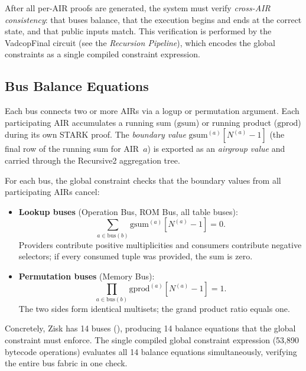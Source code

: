 After all per-AIR proofs are generated, the system must verify
\emph{cross-AIR consistency}: that buses balance, that the execution
begins and ends at the correct state, and that public inputs match.
This verification is performed by the VadcopFinal circuit
(see the \emph{Recursion Pipeline}), which encodes the
global constraints as a single compiled constraint expression.

\subsection{Bus Balance Equations}
\label{sec:bus-balance}

Each bus connects two or more AIRs via a logup or permutation argument.
Each participating AIR accumulates a running sum ($\mathrm{gsum}$) or
running product ($\mathrm{gprod}$) during its own STARK proof.
The \emph{boundary value} $\mathrm{gsum}^{(a)}[N^{(a)}-1]$
(the final row of the running sum for AIR~$a$) is exported as an
\emph{airgroup value} and carried through the Recursive2 aggregation tree.

For each bus, the global constraint checks that the boundary values
from all participating AIRs cancel:

\begin{itemize}[nosep]
  \item \textbf{Lookup buses} (Operation Bus, ROM Bus, all table buses):
        \[
          \sum_{a \in \mathrm{bus}(b)}
          \mathrm{gsum}^{(a)}[N^{(a)} - 1] = 0.
        \]
        Providers contribute positive multiplicities and consumers
        contribute negative selectors; if every consumed tuple was
        provided, the sum is zero.

  \item \textbf{Permutation buses} (Memory Bus):
        \[
          \prod_{a \in \mathrm{bus}(b)}
          \mathrm{gprod}^{(a)}[N^{(a)} - 1] = 1.
        \]
        The two sides form identical multisets;
        the grand product ratio equals one.
\end{itemize}

\noindent
Concretely, Zisk has 14 buses (),
producing 14 balance equations that the global constraint must enforce.
The single compiled global constraint expression (53{,}890 bytecode
operations) evaluates all 14 balance equations simultaneously,
verifying the entire bus fabric in one check.

